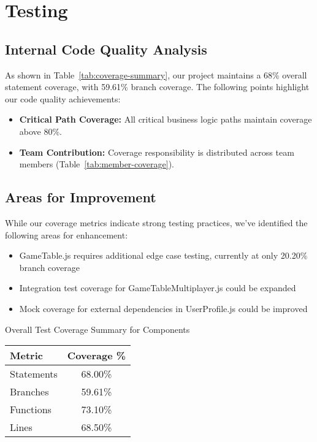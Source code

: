 

\begin{minipage}{\textwidth}
\section {Testing}
\subsection{Internal Code Quality Analysis}
As shown in Table~\ref{tab:coverage-summary}, our project maintains a 68\% overall statement coverage, with 59.61\% branch coverage. The following points highlight our code quality achievements:
\begin{itemize}
    \item \textbf{Critical Path Coverage:} All critical business logic paths maintain coverage above 80\%.
    \item \textbf{Team Contribution:} Coverage responsibility is distributed across team members (Table~\ref{tab:member-coverage}).
\end{itemize}

\subsection{Areas for Improvement}
While our coverage metrics indicate strong testing practices, we've identified the following areas for enhancement:
\begin{itemize}
    \item GameTable.js requires additional edge case testing, currently at only 20.20\% branch coverage
    \item Integration test coverage for GameTableMultiplayer.js could be expanded
    \item Mock coverage for external dependencies in UserProfile.js could be improved
\end{itemize}

\vspace{1em}
\begin{center}
 {Overall Test Coverage Summary for Components}   %
\label{tab:coverage-summary}
\begin{tabular}{|l|c|}
\hline
\textbf{Metric} & \textbf{Coverage \%} \\
\hline
Statements & 68.00\% \\
Branches & 59.61\% \\
Functions & 73.10\% \\
Lines & 68.50\% \\
\hline
\end{tabular}


\end{center}
\end{minipage}
